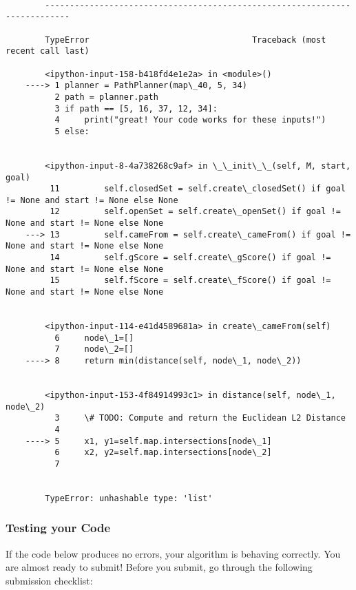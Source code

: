 \documentclass[11pt]{article}
\begin{document}
    \begin{Verbatim}[commandchars=\\\{\}]

        ---------------------------------------------------------------------------

        TypeError                                 Traceback (most recent call last)

        <ipython-input-158-b418fd4e1e2a> in <module>()
    ----> 1 planner = PathPlanner(map\_40, 5, 34)
          2 path = planner.path
          3 if path == [5, 16, 37, 12, 34]:
          4     print("great! Your code works for these inputs!")
          5 else:


        <ipython-input-8-4a738268c9af> in \_\_init\_\_(self, M, start, goal)
         11         self.closedSet = self.create\_closedSet() if goal != None and start != None else None
         12         self.openSet = self.create\_openSet() if goal != None and start != None else None
    ---> 13         self.cameFrom = self.create\_cameFrom() if goal != None and start != None else None
         14         self.gScore = self.create\_gScore() if goal != None and start != None else None
         15         self.fScore = self.create\_fScore() if goal != None and start != None else None


        <ipython-input-114-e41d4589681a> in create\_cameFrom(self)
          6     node\_1=[]
          7     node\_2=[]
    ----> 8     return min(distance(self, node\_1, node\_2))
    

        <ipython-input-153-4f84914993c1> in distance(self, node\_1, node\_2)
          3     \# TODO: Compute and return the Euclidean L2 Distance
          4 
    ----> 5     x1, y1=self.map.intersections[node\_1]
          6     x2, y2=self.map.intersections[node\_2]
          7 


        TypeError: unhashable type: 'list'

    \end{Verbatim}

    \hypertarget{testing-your-code}{%
\subsubsection{Testing your Code}\label{testing-your-code}}

If the code below produces no errors, your algorithm is behaving
correctly. You are almost ready to submit! Before you submit, go through
the following submission checklist:
\end{document}
